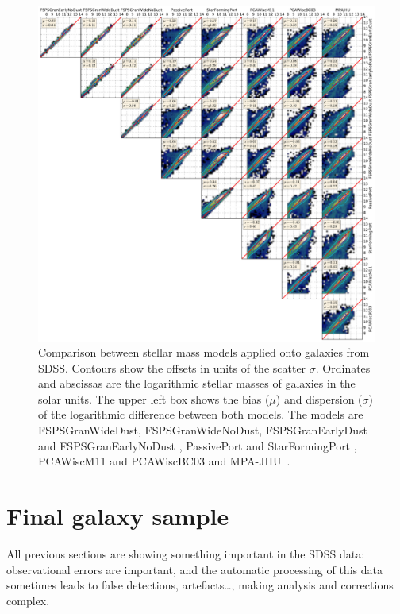 \begin{figure}[htp]
    \centering
    \includegraphics[width=\linewidth]{figures/sdss/stellar_mass_models.pdf}
    \caption{Comparison between stellar mass models applied onto galaxies from
        SDSS\@. Contours show the offsets in units of the scatter $\sigma$.
        Ordinates and abscissas are the logarithmic stellar masses of galaxies
        in the solar units. The upper left box shows the bias ($\mu$) and
        dispersion ($\sigma$) of the logarithmic difference between both
        models. The models are FSPSGranWideDust, FSPSGranWideNoDust,
        FSPSGranEarlyDust and FSPSGranEarlyNoDust \citep{Conroy+09},
        PassivePort and StarFormingPort \citep{Maraston+09}, PCAWiscM11 and
    PCAWiscBC03 \citep{Chen+12} and MPA-JHU~\citep{Brinchmann+04, Kauffmann+03,
Tremonti+04}.\label{fig:stellar_mass_models}}
\end{figure}

\section{Final galaxy sample}
\label{sec:final_galaxy_sample}

All previous sections are showing something important in the SDSS data:
observational errors are important, and the automatic processing of this data
sometimes leads to false detections, artefacts\ldots, making analysis and
corrections complex.

